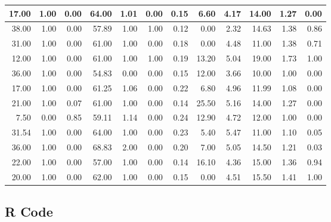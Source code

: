 \documentclass[
]{article}
\begin{document}
\begin{tabular}{r|r|r|r|r|r|r|r|r|r|r|r}
\hline
17.00 & 1.00 & 0.00 & 64.00 & 1.01 & 0.00 & 0.15 & 6.60 & 4.17 & 14.00 & 1.27 & 0.00\\
\hline
38.00 & 1.00 & 0.00 & 57.89 & 1.00 & 1.00 & 0.12 & 0.00 & 2.32 & 14.63 & 1.38 & 0.86\\
\hline
31.00 & 1.00 & 0.00 & 61.00 & 1.00 & 0.00 & 0.18 & 0.00 & 4.48 & 11.00 & 1.38 & 0.71\\
\hline
12.00 & 1.00 & 0.00 & 61.00 & 1.00 & 1.00 & 0.19 & 13.20 & 5.04 & 19.00 & 1.73 & 1.00\\
\hline
36.00 & 1.00 & 0.00 & 54.83 & 0.00 & 0.00 & 0.15 & 12.00 & 3.66 & 10.00 & 1.00 & 0.00\\
\hline
17.00 & 1.00 & 0.00 & 61.25 & 1.06 & 0.00 & 0.22 & 6.80 & 4.96 & 11.99 & 1.08 & 0.00\\
\hline
21.00 & 1.00 & 0.07 & 61.00 & 1.00 & 0.00 & 0.14 & 25.50 & 5.16 & 14.00 & 1.27 & 0.00\\
\hline
7.50 & 0.00 & 0.85 & 59.11 & 1.14 & 0.00 & 0.24 & 12.90 & 4.72 & 12.00 & 1.00 & 0.00\\
\hline
31.54 & 1.00 & 0.00 & 64.00 & 1.00 & 0.00 & 0.23 & 5.40 & 5.47 & 11.00 & 1.10 & 0.05\\
\hline
36.00 & 1.00 & 0.00 & 68.83 & 2.00 & 0.00 & 0.20 & 7.00 & 5.05 & 14.50 & 1.21 & 0.03\\
\hline
22.00 & 1.00 & 0.00 & 57.00 & 1.00 & 0.00 & 0.14 & 16.10 & 4.36 & 15.00 & 1.36 & 0.94\\
\hline
20.00 & 1.00 & 0.00 & 62.00 & 1.00 & 0.00 & 0.15 & 0.00 & 4.51 & 15.50 & 1.41 & 1.00\\
\hline
\end{tabular}

\hypertarget{r-code}{%
\subsection{R Code}\label{r-code}}
\end{document}
